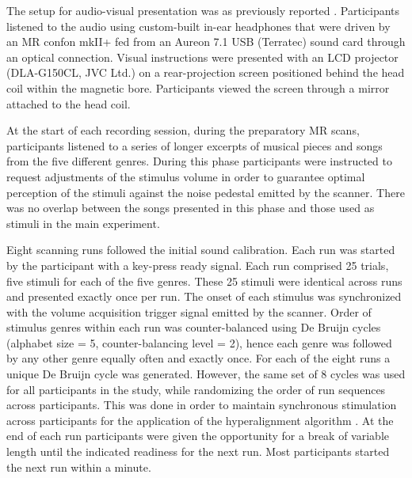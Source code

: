 The setup for audio-visual presentation was as previously reported
\cite{HBI+14}. Participants listened to the audio using custom-built in-ear
headphones that were driven by an MR confon mkII+ fed from an Aureon 7.1 USB
(Terratec) sound card through an optical connection.
Visual instructions were presented with an LCD projector (DLA-G150CL, JVC Ltd.)
on a rear-projection screen positioned behind the head coil within the magnetic
bore. Participants viewed the screen through a mirror attached to the head
coil.

At the start of each recording session, during the preparatory MR scans,
participants listened to a series of longer excerpts of musical pieces and
songs from the five different genres. During this phase participants were
instructed to request adjustments of the stimulus volume in order to guarantee
optimal perception of the stimuli against the noise pedestal emitted by the
scanner. There was no overlap between the songs presented in this phase and those
used as stimuli in the main experiment.

Eight scanning runs followed the initial sound calibration. Each run was
started by the participant with a key-press ready signal. Each run comprised 25
trials, five stimuli for each of the five genres. These 25 stimuli were identical
across runs and presented exactly once per run. The onset of each stimulus was
synchronized with the volume acquisition trigger signal emitted by the scanner.
Order of stimulus genres within each run was counter-balanced using De Bruijn
cycles \cite{AMM+2011} (alphabet size = 5, counter-balancing level = 2),
hence each genre was followed by any other genre equally often and exactly
once.  For each of the eight runs a unique De Bruijn cycle was generated.
However, the same set of 8 cycles was used for all participants in the study,
while randomizing the order of run sequences across participants. This was done
in order to maintain synchronous stimulation across participants for the
application of the hyperalignment algorithm \cite{HGC+11}. At the end of each run
participants were given the opportunity for a break of variable length until
the indicated readiness for the next run. Most participants started the next
run within a minute.

